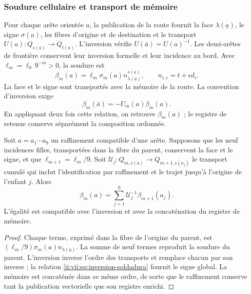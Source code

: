 \subsubsection{Soudure cellulaire et transport de mémoire}
\label{ii:vii:sec:soldadura-celular}

Pour chaque arête orientée \(a\), la publication de la route fournit
la face \(\lambda(\underline a)\), le signe
\(\sigma(a)\), les fibres d'origine et de destination et le transport
\(U(a):Q_{s(a)}\longrightarrow Q_{t(a)}\).
L'inversion vérifie \(U(\bar a)=U(a)^{-1}\).
Les demi-arêtes de frontière conservent leur inversion formelle et leur incidence
au bord. Avec \(\ell_m=\ell_0\,9^{-m}>0\), la soudure est
\begin{equation}
 \beta_m(a)=\ell_m\sigma_m(a)
              n_{\lambda(\underline a)}^{s(a)},\qquad
 n_{i,\epsilon}=t+\epsilon d_i.
 \label{ii:vii:eq:soldadura-arista}
\end{equation}
La face et le signe sont transportés avec la mémoire de la route. La convention d'inversion exige
\begin{equation}
 \beta_m(\bar a)=-U_m(a)\beta_m(a).
 \label{ii:vii:eq:inversion-soldadura}
\end{equation}
En appliquant deux fois cette relation, on retrouve \(\beta_m(a)\) ; le registre de retenue conserve séparément la composition ordonnée.

\begin{proposition}
\label{ii:vii:prop:refinamiento-soldadura}
Soit \(a=a_1\cdots a_9\) un raffinement compatible d'une arête.
Supposons que les neuf incidences filles, transportées dans la fibre du
parent, conservent la face et le signe, et que
\(\ell_{m+1}=\ell_m/9\). Soit
\(\mathcal U_j:Q_{m,s(a)}\longrightarrow Q_{m+1,s(a_j)}\)
le transport cumulé qui inclut l'identification par raffinement
et le trajet jusqu'à l'origine de l'enfant \(j\). Alors
\[
 \beta_m(a)=
 \sum_{j=1}^{9}\mathcal U_j^{-1}\beta_{m+1}(a_j).
\]
L'égalité est compatible avec l'inversion et avec la concaténation du registre de mémoire.
\end{proposition}

\begin{proof}
Chaque terme, exprimé dans la fibre de l'origine du parent, est
\((\ell_m/9)\sigma_m(a)n_{\lambda(\underline a)}\).
La somme de neuf termes reproduit la soudure du parent.
L'inversion inverse l'ordre des transports et remplace chacun
par son inverse ; la relation \eqref{ii:vii:eq:inversion-soldadura} fournit
le signe global. La mémoire est concaténée dans ce même ordre, de sorte
que le raffinement conserve tant la publication vectorielle que son
registre enrichi.
\end{proof}

